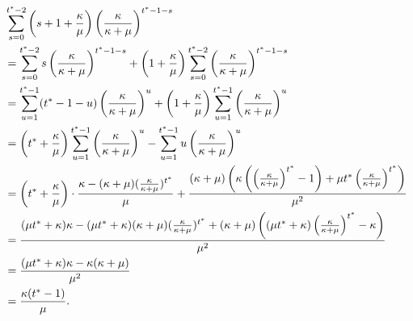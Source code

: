         \begin{align*}
         & \sum_{s=0}^{t^*-2} \left(s+1+\frac{\kappa}{\mu} \right) \left(\frac{\kappa}{\kappa+\mu}\right)^{t^* - 1 - s}\\
         &= \sum_{s=0}^{t^*-2} s \left(\frac{\kappa}{\kappa+\mu}\right)^{t^* - 1 - s} + \left(1 + \frac{\kappa}{\mu}\right) \sum_{s=0}^{t^*-2} \left(\frac{\kappa}{\kappa+\mu}\right)^{t^* - 1 - s}\\
         &= \sum_{u=1}^{t^*-1} (t^*-1-u) \left(\frac{\kappa}{\kappa+\mu}\right)^{u}  + \left(1 + \frac{\kappa}{\mu}\right) \sum_{u=1}^{t^*-1} \left(\frac{\kappa}{\kappa+\mu}\right)^{u}\\
         &= \left(t^* + \frac{\kappa}{\mu}\right) \sum_{u=1}^{t^*-1} \left(\frac{\kappa}{\kappa+\mu}\right)^{u} - \sum_{u=1}^{t^*-1} u \left(\frac{\kappa}{\kappa+\mu}\right)^{u}\\
         &= \left(t^* + \frac{\kappa}{\mu}\right) \cdot \frac{\kappa -(\kappa+\mu) (\frac{\kappa}{\kappa + \mu})^{t^*}}{\mu} + \frac{(\kappa + \mu) \left( \kappa \left(  \left( \frac{\kappa}{\kappa + \mu} \right)^{t^*} -1 \right) + \mu t^* \left( \frac{\kappa}{\kappa + \mu} \right)^{t^*} \right)}{\mu^2}\\
         &= \frac{(\mu t^* + \kappa) \kappa - (\mu t^* + \kappa) (\kappa + \mu)(\frac{\kappa}{\kappa + \mu})^{t^*} + (\kappa + \mu) \left( (\mu t^* + \kappa)\left( \frac{\kappa}{\kappa + \mu} \right)^{t^*} -\kappa \right)}{\mu^2}\\
         &= \frac{(\mu t^* + \kappa) \kappa -\kappa (\kappa + \mu)}{\mu^2}\\
         &= \frac{\kappa(t^*-1)}{\mu}.
    \end{align*}
    
